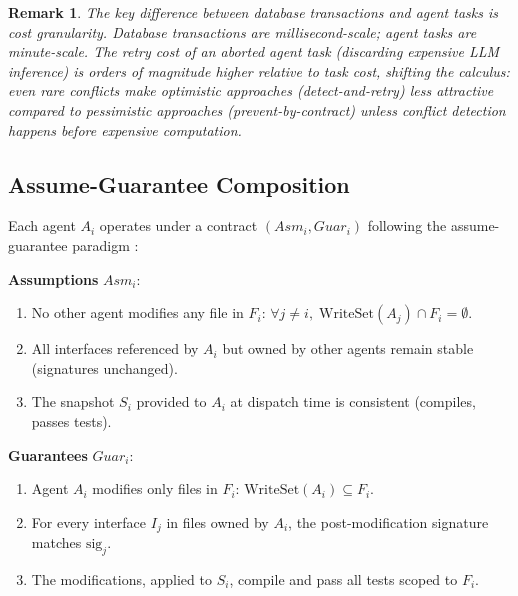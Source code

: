 \documentclass[11pt, a4paper, logo, copyright]{googledeepmind}
\newtheorem*{remark}{Remark}
\begin{document}
\begin{remark}
The key difference between database transactions and agent tasks is cost granularity. Database transactions are millisecond-scale; agent tasks are minute-scale. The retry cost of an aborted agent task (discarding expensive LLM inference) is orders of magnitude higher relative to task cost, shifting the calculus: even rare conflicts make optimistic approaches (detect-and-retry) less attractive compared to pessimistic approaches (prevent-by-contract) unless conflict detection happens before expensive computation.
\end{remark}

\subsection{Assume-Guarantee Composition}

Each agent $A_i$ operates under a contract $(Asm_i, Guar_i)$ following the assume-guarantee paradigm \citep{meyer1992, henzinger2002}:

\medskip
\noindent\textbf{Assumptions} $Asm_i$:
\begin{enumerate}[nosep, label=(A\arabic*)]
    \item No other agent modifies any file in $F_i$: $\forall j \neq i, \; \mathrm{WriteSet}(A_j) \cap F_i = \emptyset$.
    \item All interfaces referenced by $A_i$ but owned by other agents remain stable (signatures unchanged).
    \item The snapshot $S_i$ provided to $A_i$ at dispatch time is consistent (compiles, passes tests).
\end{enumerate}

\noindent\textbf{Guarantees} $Guar_i$:
\begin{enumerate}[nosep, label=(G\arabic*)]
    \item Agent $A_i$ modifies only files in $F_i$: $\mathrm{WriteSet}(A_i) \subseteq F_i$.
    \item For every interface $I_j$ in files owned by $A_i$, the post-modification signature matches $\mathrm{sig}_j$.
    \item The modifications, applied to $S_i$, compile and pass all tests scoped to $F_i$.
\end{enumerate}
\end{document}
